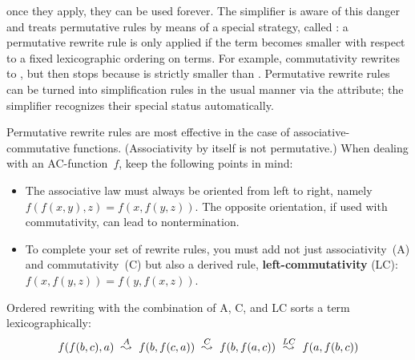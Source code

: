 \begin{isabellebody}
\begin{isamarkuptext}
once they apply, they can be used forever. The simplifier is aware of this
danger and treats permutative rules by means of a special strategy, called
: a permutative rewrite
rule is only applied if the term becomes smaller with respect to a fixed
lexicographic ordering on terms. For example, commutativity rewrites
 to , but then stops because  is strictly
smaller than .  Permutative rewrite rules can be turned into
simplification rules in the usual manner via the  attribute; the
simplifier recognizes their special status automatically.

Permutative rewrite rules are most effective in the case of
associative-commutative functions.  (Associativity by itself is not
permutative.)  When dealing with an AC-function~$f$, keep the
following points in mind:
\begin{itemize}
  
\item The associative law must always be oriented from left to right,
  namely $f(f(x,y),z) = f(x,f(y,z))$.  The opposite orientation, if
  used with commutativity, can lead to nontermination.

\item To complete your set of rewrite rules, you must add not just
  associativity~(A) and commutativity~(C) but also a derived rule, {\bf
    left-com\-mut\-ativ\-ity} (LC): $f(x,f(y,z)) = f(y,f(x,z))$.
\end{itemize}
Ordered rewriting with the combination of A, C, and LC sorts a term
lexicographically:
\[\def\maps#1{~\stackrel{#1}{\leadsto}~}
 f(f(b,c),a) \maps{A} f(b,f(c,a)) \maps{C} f(b,f(a,c)) \maps{LC} f(a,f(b,c)) \]


\end{isamarkuptext}
\end{isabellebody}
